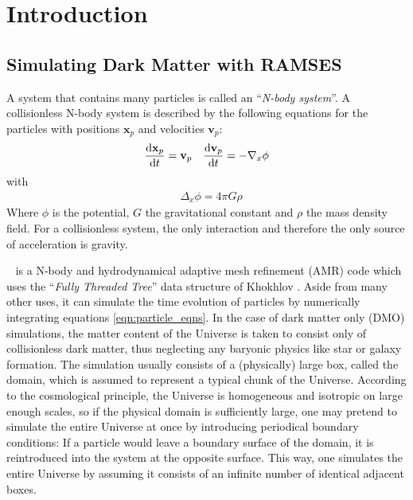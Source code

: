 \section{Introduction}\label{chap:introduction}


\subsection{Simulating Dark Matter with {\normalfont \scshape RAMSES}}



A system that contains many particles is called an ``\emph{N-body system}''.
A collisionless N-body system is described by the following equations for the particles with positions $\mathbf{x}_p$ and velocities $\mathbf{v}_p$:
\begin{align}
&\frac{\mathrm{d}\mathbf{x}_p}{\mathrm{d} t} =  \mathbf{v}_p &\frac{\mathrm{d}\mathbf{v}_p}{\mathrm{d} t} = - \nabla_x \phi \label{eqn:particle_eqns}
\end{align}
%
with
%
\begin{align}
&\Delta_x \phi = 4 \pi G \rho \label{eq:poisson}
\end{align}	
%
Where $\phi$ is the potential, $G$ the gravitational constant and $\rho$ the mass density field.
For a collisionless system, the only interaction and therefore the only source of acceleration is gravity.

\ramses\ \parencite{ramses} is a N-body and hydrodynamical adaptive mesh refinement (AMR) code which uses the ``\emph{Fully Threaded Tree}'' data structure of Khokhlov \parencite{FTT}.
Aside from many other uses, it can simulate the time evolution of particles by numerically integrating equations \eqref{eqn:particle_eqns}.
In the case of dark matter only (DMO) simulations, the matter content of the Universe is taken to consist only of collisionless dark matter, thus neglecting any baryonic physics like star or galaxy formation.
The simulation usually consists of a (physically) large box, called the domain, which is assumed to represent a typical chunk of the Universe.
According to the cosmological principle, the Universe is homogeneous and isotropic on large enough scales, so if the physical domain is sufficiently large, one may pretend to simulate the entire Universe at once by introducing periodical boundary conditions: 
If a particle would leave a boundary surface of the domain, it is reintroduced into the system at the opposite surface.
This way, one simulates the entire Universe by assuming it consists of an infinite number of identical adjacent boxes.

